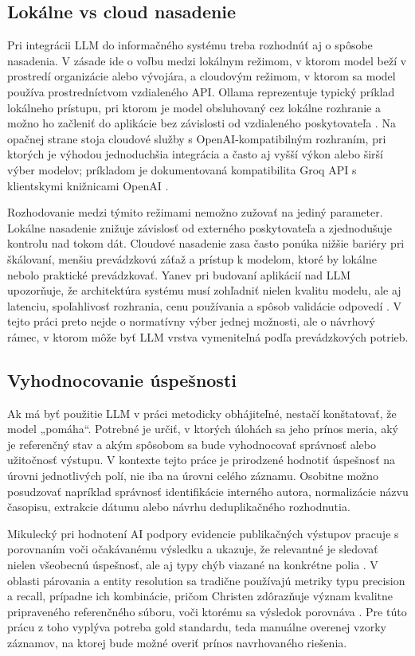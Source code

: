 \subsection{Lokálne vs cloud nasadenie}

Pri integrácii LLM do informačného systému treba rozhodnúť aj o spôsobe nasadenia. V zásade ide o voľbu medzi lokálnym režimom, v ktorom model beží v prostredí organizácie alebo vývojára, a cloudovým režimom, v ktorom sa model používa prostredníctvom vzdialeného API. Ollama reprezentuje typický príklad lokálneho prístupu, pri ktorom je model obsluhovaný cez lokálne rozhranie a možno ho začleniť do aplikácie bez závislosti od vzdialeného poskytovateľa \cite{OllamaDocs}. Na opačnej strane stoja cloudové služby s OpenAI-kompatibilným rozhraním, pri ktorých je výhodou jednoduchšia integrácia a často aj vyšší výkon alebo širší výber modelov; príkladom je dokumentovaná kompatibilita Groq API s klientskymi knižnicami OpenAI \cite{GroqOpenAICompatibility}.

Rozhodovanie medzi týmito režimami nemožno zužovať na jediný parameter. Lokálne nasadenie znižuje závislosť od externého poskytovateľa a zjednodušuje kontrolu nad tokom dát. Cloudové nasadenie zasa často ponúka nižšie bariéry pri škálovaní, menšiu prevádzkovú záťaž a prístup k modelom, ktoré by lokálne nebolo praktické prevádzkovať. Yanev pri budovaní aplikácií nad LLM upozorňuje, že architektúra systému musí zohľadniť nielen kvalitu modelu, ale aj latenciu, spoľahlivosť rozhrania, cenu používania a spôsob validácie odpovedí \cite{Yanev2024}. V tejto práci preto nejde o normatívny výber jednej možnosti, ale o návrhový rámec, v ktorom môže byť LLM vrstva vymeniteľná podľa prevádzkových potrieb.

\subsection{Vyhodnocovanie úspešnosti}

Ak má byť použitie LLM v práci metodicky obhájiteľné, nestačí konštatovať, že model „pomáha“. Potrebné je určiť, v ktorých úlohách sa jeho prínos meria, aký je referenčný stav a akým spôsobom sa bude vyhodnocovať správnosť alebo užitočnosť výstupu. V kontexte tejto práce je prirodzené hodnotiť úspešnosť na úrovni jednotlivých polí, nie iba na úrovni celého záznamu. Osobitne možno posudzovať napríklad správnosť identifikácie interného autora, normalizácie názvu časopisu, extrakcie dátumu alebo návrhu deduplikačného rozhodnutia.

Mikulecký pri hodnotení AI podpory evidencie publikačných výstupov pracuje s porovnaním voči očakávanému výsledku a ukazuje, že relevantné je sledovať nielen všeobecnú úspešnosť, ale aj typy chýb viazané na konkrétne polia \cite{Mikulecky2025}. V oblasti párovania a entity resolution sa tradične používajú metriky typu precision a recall, prípadne ich kombinácie, pričom Christen zdôrazňuje význam kvalitne pripraveného referenčného súboru, voči ktorému sa výsledok porovnáva \cite{Christen2012}. Pre túto prácu z toho vyplýva potreba gold standardu, teda manuálne overenej vzorky záznamov, na ktorej bude možné overiť prínos navrhovaného riešenia.

